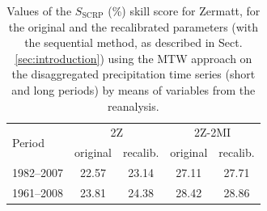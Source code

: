 \documentclass[hess, manuscript]{copernicus}
\begin{document}
\begin{table}[htb]
	\caption{Values of the $S_{\text{SCRP}}$ (\%) skill score for Zermatt, for the original and the recalibrated parameters (with the sequential method, as described in Sect. \ref{sec:introduction}) using the MTW approach on the disaggregated precipitation time series (short and long periods) by means of variables from the reanalysis.}
	\begin{center}
		\begin{tabular}{l c c c c}
			\hline
			\multirow{2}{*}{Period} & \multicolumn{2}{c}{2Z} & \multicolumn{ 2}{c}{2Z-2MI} \\
			& original & recalib. & original & recalib. \\
			\hline
			1982--2007 & 22.57 & 23.14 & 27.11 & 27.71 \\
			1961--2008 & 23.81 & 24.38 & 28.42 & 28.86 \\
			\hline
		\end{tabular}
	\end{center}
	\label{table:proxy_CRPSS}
\end{table}









\end{document}
